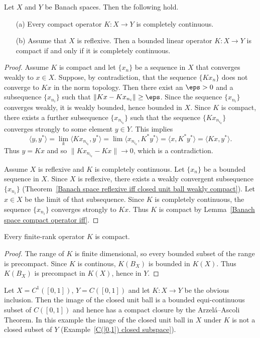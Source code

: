 \begin{lemma}\label{Banach space compact and completely continuous}
Let $X$ and $Y$ be Banach spaces. Then the following hold.
\begin{itemize}
\item[(a)] Every compact operator $K:X\to Y$ is completely continuous.
\item[(b)] Assume that $X$ is reflexive. Then a bounded linear operator $K:X\to Y$ is compact if and only if it is completely continuous.
\end{itemize}
\end{lemma}
\begin{proof}
Assume $K$ is compact and let $\{x_n\}$ be a sequence in $X$ that converges weakly to $x\in X$. Suppose, by contradiction, that the sequence $\{Kx_n\}$ does not converge to $Kx$ in the norm topology. Then there exist an $\eps>0$ and a subsequence $\{x_{n_i}\}$ such that $\|Kx-Kx_{n_i}\|\geq\eps$. Since the sequence $\{x_{n_i}\}$ converges weakly, it is weakly bounded, hence bounded in $X$. Since $K$ is compact, there exists a further subsequence $\{x_{n_{i_k}}\}$ such that the sequence $\{Kx_{n_{i_k}}\}$ converges strongly to some element $y\in Y$. This implies
\[\langle y,y^*\rangle=\lim_k\langle Kx_{n_{i_k}},y^*\rangle=\lim\langle x_{n_{i_k}},K^*y^*\rangle=\langle x,K^*y^*\rangle=\langle Kx,y^*\rangle.\]
Thus $y=Kx$ and so $\|Kx_{n_{i_k}}-Kx\|\to 0$, which is a contradiction.\par
Assume $X$ is reflexive and $K$ is completely continuous. Let $\{x_n\}$ be a bounded sequence in $X$. Since $X$ is reflexive, there exists a weakly convergent subsequence $\{x_{n_i}\}$ (Theorem~\ref{Banach space reflexive iff closed unit ball weakly compact}). Let $x\in X$ be the limit of that subsequence. Since $K$ is completely continuous, the sequence $\{x_{n_i}\}$ converges strongly to $Kx$. Thus $K$ is compact by Lemma~\ref{Banach space compact operator iff}.
\end{proof}
\begin{proposition}
Every finite-rank operator $K$ is compact.
\end{proposition}
\begin{proof}
The range of $K$ is finite dimensional, so every bounded subset of the range is precompact. Since $K$ is continous, $K(B_X)$ is bounded in $K(X)$. Thus $K(B_X)$ is precompact in $K(X)$, hence in $Y$.
\end{proof}
\begin{example}
Let $X=C^1([0,1])$, $Y=C([0,1])$ and let $K:X\to Y$ be the obvious inclusion. Then the image of the closed unit ball is a bounded equi-continuous subset of $C([0,1])$ and hence has a compact closure by the Arzel\'a–Ascoli Theorem. In this example the image of the closed unit ball in $X$ under $K$ is not a closed subset of $Y$ (Example~\ref{C([0,1]) closed subspace}).
\end{example}
